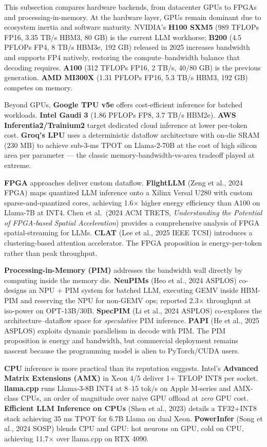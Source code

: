 This subsection compares hardware backends, from datacenter GPUs to FPGAs and processing-in-memory. At the hardware layer, GPUs remain dominant due to ecosystem inertia and software maturity. NVIDIA's \textbf{H100 SXM5} (989 TFLOPs FP16, 3.35 TB/s HBM3, 80 GB) is the current LLM workhorse; \textbf{B200} (4.5 PFLOPs FP4, 8 TB/s HBM3e, 192 GB) released in 2025 increases bandwidth and supports FP4 natively, restoring the compute--bandwidth balance that decoding requires. \textbf{A100} (312 TFLOPs FP16, 2 TB/s, 40/80 GB) is the previous generation. \textbf{AMD MI300X} (1.31 PFLOPs FP16, 5.3 TB/s HBM3, 192 GB) competes on memory.

Beyond GPUs, \textbf{Google TPU v5e} offers cost-efficient inference for batched workloads. \textbf{Intel Gaudi 3} (1.86 PFLOPs FP8, 3.7 TB/s HBM2e). \textbf{AWS Inferentia2/Trainium2} target dedicated cloud inference at lower per-token cost. \textbf{Groq's LPU} uses a deterministic dataflow architecture with on-die SRAM (230 MB) to achieve sub-3-ms TPOT on Llama-2-70B at the cost of high silicon area per parameter --- the classic memory-bandwidth-vs-area tradeoff played at extreme.

\textbf{FPGA} approaches deliver custom dataflow. \textbf{FlightLLM} (Zeng et al., 2024 FPGA) maps quantized LLM inference onto a Xilinx Versal U280 with custom sparse-and-quantized cores, achieving 1.6× higher energy efficiency than A100 on Llama-7B at INT4. Chen et al.~(2024 ACM TRETS, \emph{Understanding the Potential of FPGA-based Spatial Acceleration}) provides a comprehensive analysis of FPGA spatial-streaming for LLMs. \textbf{CLAT} (Lee et al., 2025 IEEE TCSI) introduces a clustering-based attention accelerator. The FPGA proposition is energy-per-token rather than peak throughput.

\textbf{Processing-in-Memory (PIM)} addresses the bandwidth wall directly by computing inside the memory die. \textbf{NeuPIMs} (Heo et al., 2024 ASPLOS) co-designs an NPU + PIM system for batched LLM, executing GEMV inside HBM-PIM and reserving the NPU for non-GEMV ops; reported 2.3× throughput at iso-power on OPT-13B/30B. \textbf{SpecPIM} (Li et al., 2024 ASPLOS) co-explores the architecture--dataflow space for \emph{speculative} PIM inference. \textbf{PAPI} (He et al., 2025 ASPLOS) exploits dynamic parallelism in decode with PIM. The PIM proposition is energy and bandwidth, but commercial deployment remains nascent because the programming model is alien to PyTorch/CUDA users.

\textbf{CPU} inference is more practical than its reputation suggests. Intel's \textbf{Advanced Matrix Extensions (AMX)} in Xeon 4/5 deliver 1+ TFLOP INT8 per socket. \textbf{llama.cpp} runs Llama-3-8B INT4 at 8--15 tok/s on Apple M-series and AMX-class CPUs, an order of magnitude over naive GPU offload at \emph{zero} GPU cost. \textbf{Efficient LLM Inference on CPUs} (Shen et al., 2023) details a TF32+INT8 stack achieving 35 ms TPOT for 6.7B Llama on dual Xeon. \textbf{PowerInfer} (Song et al., 2024 SOSP) blends CPU and GPU: hot neurons on GPU, cold on CPU, achieving 11.7× over llama.cpp on RTX 4090.

